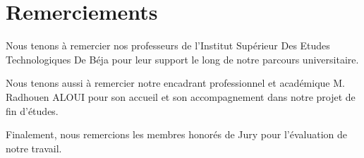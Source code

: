 \chapter*{Remerciements}



Nous tenons à remercier nos professeurs de l'Institut Supérieur Des Etudes Technologiques De Béja pour leur support le long de notre parcours universitaire.

Nous tenons aussi à remercier notre encadrant professionnel et académique M. Radhouen ALOUI pour son accueil et son accompagnement dans notre projet de fin d'études.

Finalement, nous remercions les membres honorés de Jury pour l'évaluation de notre travail.

